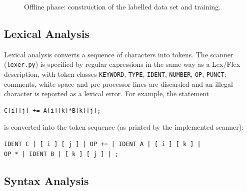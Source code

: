 \documentclass[12pt,a4paper]{article}
\begin{document}
\begin{figure}[H]
\centering
{}
\caption{Offline phase: construction of the labelled data set and training.}
\label{fig:offline}
\end{figure}

\subsection{Lexical Analysis}

Lexical analysis converts a sequence of characters into tokens. The scanner
(\texttt{lexer.py}) is specified by regular expressions in the same way as a
Lex/Flex description, with token classes \texttt{KEYWORD}, \texttt{TYPE},
\texttt{IDENT}, \texttt{NUMBER}, \texttt{OP}, \texttt{PUNCT}; comments,
white space and pre-processor lines are discarded and an illegal character is
reported as a lexical error. For example, the statement

\begin{verbatim}
C[i][j] += A[i][k]*B[k][j];
\end{verbatim}

is converted into the token sequence (as printed by the implemented scanner):

\begin{verbatim}
IDENT C | [ i ] [ j ] | OP += | IDENT A | [ i ] [ k ] |
OP * | IDENT B | [ k ] [ j ] | ;
\end{verbatim}

\subsection{Syntax Analysis}
\end{document}
